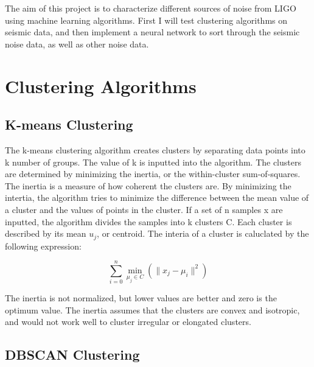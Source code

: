 \documentclass[colorlinks=true,pdfstartview=FitV,linkcolor=blue,
            citecolor=red,urlcolor=magenta]{ligodoc}
\begin{document}
\par The aim of this project is to characterize different sources of noise from LIGO using machine learning algorithms. First I  will test clustering algorithms on seismic data, and then implement a neural network to sort through the seismic noise data, as well as other noise data.

\section{Clustering Algorithms}

\subsection{K-means Clustering}

\indent

\par The k-means clustering algorithm creates clusters by separating data points into k number of groups. The value of k is inputted into the algorithm. The clusters are determined by minimizing the inertia, or the within-cluster sum-of-squares. The inertia is a measure of how coherent the clusters are. By minimizing the intertia, the algorithm tries to minimize the difference between the mean value of a cluster and the values of points in the cluster. If a set of n samples x are inputted, the algorithm divides the samples into k clusters C. Each cluster is described by its mean \(u_j\), or centroid. The interia of a cluster is caluclated by the following expression:

\[\sum_{i=0}^{n} \min_{\mu_j \in  C}(\|x_j-\mu_i\|^2)\]

\par The inertia is not normalized, but lower values are better and zero is the optimum value. The inertia assumes that the clusters are convex and isotropic, and would not work well to cluster irregular or elongated clusters. \cite{Citation2}\cite{Citation3} 

\subsection{DBSCAN Clustering}

\indent
\end{document}
